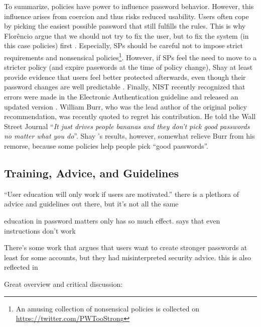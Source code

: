 	To summarize, policies have power to influence password behavior. However, this influence arises from coercion and thus risks reduced usability. Users often cope by picking the easiest possible password that still fulfills the rules. This is why Florêncio \etal argue that we should not try to fix the user, but to fix the system (in this case policies) first \cite{Florencio2014AdministratorsGuide}. Especially, \glspl{SP} should be careful not to impose strict requirements and nonsensical policies\footnote{An amusing collection of nonsensical policies is collected on \url{https://twitter.com/PWTooStrong} }. However, if \glspl{SP} feel the need to move to a stricter policy (and expire passwords at the time of policy change), Shay \etal at least provide evidence that users feel better protected afterwards, even though their password changes are well predictable \cite{Shay2010EncounteringPasswordRequirements}. Finally, \gls{NIST} recently recognized that errors were made in the Electronic Authentication guideline and released an updated version \ar. William Burr, who was the lead author of the original policy recommendation, was recently quoted to regret his contribution. He told the Wall Street Journal ``\textit{It just drives people bananas and they don’t pick good passwords no matter what you do}''. Shay \etal's results, however, somewhat relieve Burr from his remorse, because some policies help people pick ``good passwords''.

	\subsection{Training, Advice, and Guidelines}\label{sec:rw:advice_guidance}
	``User education will only work if users are motivated.'' \cite{Sasse2001WeakestLink}
	there is a plethora of advice and guidelines out there, but it's not all the same 
	
	education in password matters only has so much effect. 
	\cite{Forget2007HelpingUsers} says that even instructions don't work
	
	There's some work that argues that users want to create stronger passwords at least for some accounts, but they had
	misinterpreted security advice. 
	this is also reflected in \cite{Ur2016PerceptionsPassword}
	
	Great overview and critical discussion: \cite{ZhangKennedy2016RevisitingPasswordRules}
	
